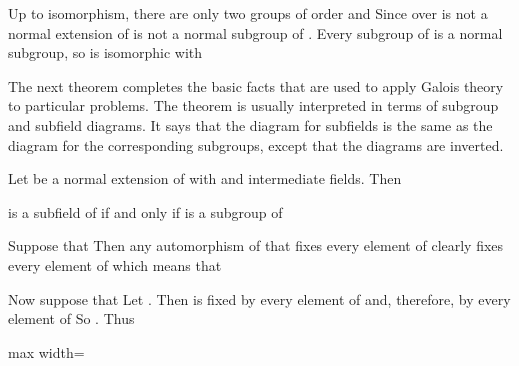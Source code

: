 \documentclass[11pt,oneside]{article}
\begin{document}
\begin{BookBody}

Up to isomorphism, there are only two groups of order  and  Since  over  is not a normal extension of  is not a normal subgroup of . Every subgroup of  is a normal subgroup, so  is isomorphic with \BookEnd{\blacktriangle}

The next theorem completes the basic facts that are used to apply Galois theory to particular problems. The theorem is usually interpreted in terms of subgroup and subfield diagrams. It says that the diagram for subfields is the same as the diagram for the corresponding subgroups, except that the diagrams are inverted.

 Let  be a normal extension of  with  and  intermediate fields. Then

 is a subfield of  if and only if  is a subgroup of 

 Suppose that  Then any automorphism of  that fixes every element of  clearly fixes every element of  which means that 

Now suppose that  Let . Then \BookInline{\alpha } is fixed by every element of  and, therefore, by every element of  So . Thus

\begin{center}\begin{adjustbox}{max width=\linewidth}\end{adjustbox}\end{center} \BookEnd{\blacklozenge}


\end{BookBody}
\end{document}
